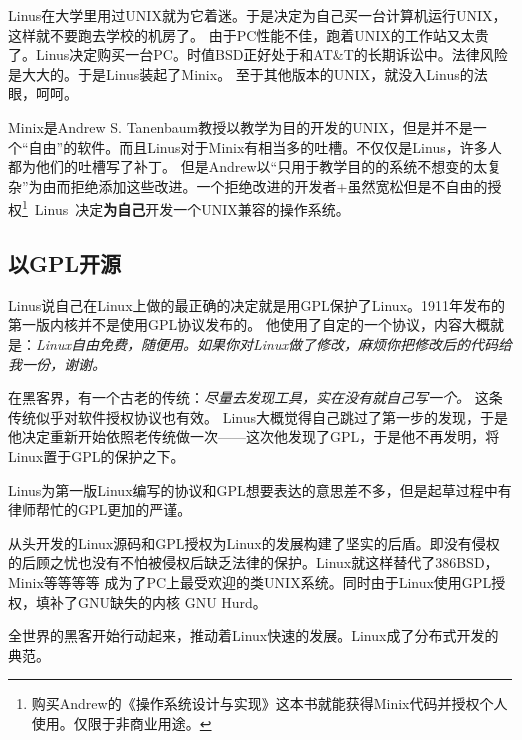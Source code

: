 Linus在大学里用过UNIX就为它着迷。于是决定为自己买一台计算机运行UNIX，这样就不要跑去学校的机房了。
由于PC性能不佳，跑着UNIX的工作站又太贵了。Linus决定购买一台PC。时值BSD正好处于和AT\&T的长期诉讼中。法律风险是大大的。于是Linus装起了Minix。
至于其他版本的UNIX，就没入Linus的法眼，呵呵。

Minix是Andrew S. Tanenbaum教授以教学为目的开发的UNIX，但是并不是一个“自由”的软件。而且Linus对于Minix有相当多的吐槽。不仅仅是Linus，许多人都为他们的吐槽写了补丁。
但是Andrew以“只用于教学目的的系统不想变的太复杂”为由而拒绝添加这些改进。一个拒绝改进的开发者+虽然宽松但是不自由的授权\footnote{
购买Andrew的《操作系统设计与实现》这本书就能获得Minix代码并授权个人使用。仅限于非商业用途。}\textrightarrow ~Linus~决定\textbf{为自己}开发一个UNIX兼容的操作系统。


\subsection{以GPL开源}

Linus说自己在Linux上做的最正确的决定就是用GPL保护了Linux。1911年发布的第一版内核并不是使用GPL协议发布的。
他使用了自定的一个协议，内容大概就是：{\it Linux自由免费，随便用。如果你对Linux做了修改，麻烦你把修改后的代码给我一份，谢谢。}

在黑客界，有一个古老的传统：\emph{尽量去发现工具，实在没有就自己写一个。} 这条传统似乎对软件授权协议也有效。
%
Linus大概觉得自己跳过了第一步的发现，于是他决定重新开始依照老传统做一次——这次他发现了GPL，于是他不再发明，将Linux置于GPL的保护之下。

Linus为第一版Linux编写的协议和GPL想要表达的意思差不多，但是起草过程中有律师帮忙的GPL更加的严谨。

从头开发的Linux源码和GPL授权为Linux的发展构建了坚实的后盾。即没有侵权的后顾之忧也没有不怕被侵权后缺乏法律的保护。Linux就这样替代了386BSD，Minix等等等等
成为了PC上最受欢迎的类UNIX系统。同时由于Linux使用GPL授权，填补了GNU缺失的内核 GNU Hurd。

全世界的黑客开始行动起来，推动着Linux快速的发展。Linux成了分布式开发的典范。
